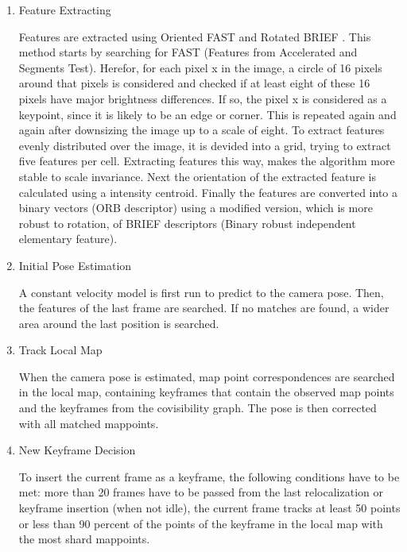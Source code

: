 	\begin{enumerate}
	\item Feature Extracting 
	
	Features are extracted using Oriented FAST and Rotated BRIEF \cite{orb_feat}. This method starts by searching for 
	FAST (Features from Accelerated and Segments Test). Herefor, for each pixel x in the image, a circle of 16 pixels around that pixels
	is considered and checked if at least eight of these 16 pixels have major brightness differences. If so, the pixel x is considered as 
	a keypoint, since it is likely to be an edge or corner. This is repeated again and again after downsizing the image up to a scale of eight. 
	To extract features evenly distributed over the image, it is devided into a grid, trying to extract five features per cell. 
	Extracting features this way, makes the algorithm more stable to scale invariance. 
	Next the orientation of the extracted feature is calculated using a intensity centroid. 
	Finally the features are converted into a binary vectors (ORB descriptor) using a modified version, which is more robust to rotation, of BRIEF descriptors (Binary robust independent elementary feature).
	
	
	
	\item Initial Pose Estimation
	
	A constant velocity model is first run to predict to the camera pose. Then, the features of the last frame are searched. If no matches are found, 
	a wider area around the last position is searched. 
	
	\item Track Local Map 
	
	When the camera pose is estimated, map point correspondences are searched in 
	the local map, containing keyframes that contain the observed map points and
	the keyframes from the covisibility graph. The pose is then corrected with all
	matched mappoints. 
	
	
	
	\item New Keyframe Decision 
	
	To insert the current frame as a keyframe, the following conditions have to be met:
	more than 20 frames have to be passed from the last relocalization or keyframe insertion (when not idle), 
    the current frame tracks at least 50 points or less than 90 percent of the points of the keyframe in the local 
    map with the most shard mappoints. 	
	
	
	\end{enumerate}
	

